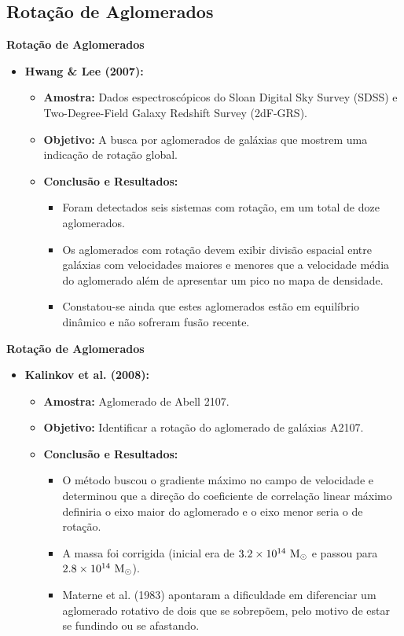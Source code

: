 \documentclass[xcolor=dvipsnames,10pt]{beamer}
\begin{document}
\subsection{Rotação de Aglomerados}
\begin{frame}{\textbf{Rotação de Aglomerados}}
\begin{itemize}
  \item {\textbf{Hwang \& Lee (2007):}}  
  \begin{itemize}
    \item \textbf{Amostra:} Dados espectroscópicos do Sloan Digital Sky Survey (SDSS) e Two-Degree-Field Galaxy Redshift Survey (2dF-GRS).
    \item \textbf{Objetivo:} A busca por aglomerados de galáxias que mostrem uma indicação de rotação global.
    \item \textbf{Conclusão e Resultados:}
    \begin{itemize}
      \item Foram detectados seis sistemas com rotação, em um total de doze aglomerados.
      \item Os aglomerados com rotação devem exibir divisão espacial entre galáxias com velocidades maiores e menores que a velocidade média do aglomerado além de apresentar um pico no mapa de densidade.
      \item Constatou-se ainda que estes aglomerados estão em equilíbrio dinâmico e não sofreram fusão recente.
    \end{itemize}
  \end{itemize}
\end{itemize}
\end{frame}

\begin{frame}{\textbf{Rotação de Aglomerados}}
\begin{itemize}
  \item {\textbf{Kalinkov et al. (2008):}}  
    \begin{itemize}
      \item \textbf{Amostra:} Aglomerado de Abell 2107.
      \item \textbf{Objetivo:} Identificar a rotação do aglomerado de galáxias A2107.
      \item \textbf{Conclusão e Resultados:}
      \begin{itemize}
        \item O método buscou o gradiente máximo no campo de velocidade e determinou que a direção do coeficiente de correlação linear máximo definiria o eixo maior do aglomerado e o eixo menor seria o de rotação.
        \item A massa foi corrigida (inicial era de $3.2\times10^{14}~{\rm M_\odot}$ e passou para $2.8\times10^{14}~{\rm M_\odot}$).
        \item Materne et al. (1983) apontaram a dificuldade em diferenciar um aglomerado rotativo de dois que se sobrepõem, pelo motivo de estar se fundindo ou se afastando.
      \end{itemize}
    \end{itemize}
\end{itemize}
\end{frame}
\end{document}
